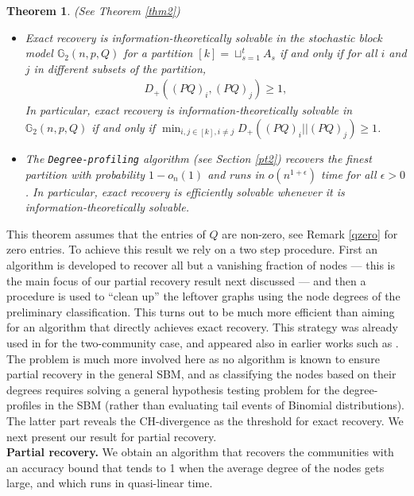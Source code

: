 \documentclass[11pt]{article}
\newcommand{\gs}{\mathbb{G}_2}
\newcommand{\dd}{D_+}
\newcommand{\1}{\mathbb{1}}
\newtheorem{theorem}{Theorem}
\begin{document}
\begin{theorem}(See Theorem \ref{thm2})
\begin{itemize}
\item Exact recovery is information-theoretically solvable in the stochastic block model $\gs(n,p,Q)$ for a partition $[k] = \sqcup_{s=1}^t A_s$ if and only if for all $i$ and $j$ in different subsets of the partition,
\begin{align}
\dd ((PQ)_i , (PQ)_j) \geq 1, \label{d1}
\end{align}
In particular, exact recovery is information-theoretically solvable in $\gs(n,p,Q)$ if and only if $\min_{i,j \in [k], i \neq j} \dd ((PQ)_i || (PQ)_j) \geq 1$.
\item The {\tt Degree-profiling} algorithm (see Section \ref{pt2}) recovers the finest partition with probability $1-o_n(1)$ and runs in $o(n^{1+\epsilon})$ time for all $\epsilon>0$. In particular, exact recovery is efficiently solvable whenever it is information-theoretically solvable. 
\end{itemize} 
\end{theorem}
This theorem assumes that the entries of $Q$ are non-zero, see Remark \ref{qzero} for zero entries. To achieve this result we rely on a two step procedure. First an algorithm is developed to recover all but a vanishing fraction of nodes --- this is the main focus of our partial recovery result next discussed --- and then a procedure is used to ``clean up'' the leftover graphs using the node degrees of the preliminary classification. This turns out to be much more efficient than aiming for an algorithm that directly achieves exact recovery. This strategy was already used in \cite{abh} for the two-community case, and appeared also in earlier works such as \cite{dyer,alon-k}. The problem is much more involved here as no algorithm is known to ensure partial recovery in the general SBM, and as classifying the nodes based on their degrees requires solving a general hypothesis testing problem for the degree-profiles in the SBM (rather than evaluating tail events of Binomial distributions). The latter part reveals the CH-divergence as the threshold for exact recovery. We next present our result for partial recovery.\\

\noindent
{\bf Partial recovery.} We obtain an algorithm that recovers the communities with an accuracy bound that tends to 1 when the average degree of the nodes gets large, and which runs in quasi-linear time. %
\end{document}
